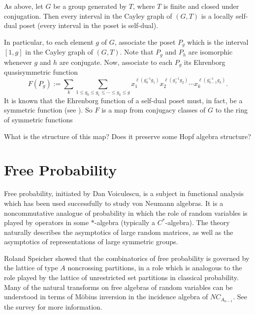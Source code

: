 \documentclass[12pt,letterpaper, reqno]{amsart}
\begin{document}
\begin{problemblock}As above, let $G$ be a group generated by $T$, where $T$ is finite and closed under conjugation. Then every interval in the Cayley graph of $(G,T)$ is a locally self-dual poset (every interval in the poset is self-dual).

In particular, to each element $g$ of $G$, associate the poset $P_g$ which is the interval $[1,g]$ in the Cayley graph of $(G,T)$. Note that $P_g$ and $P_h$ are isomorphic whenever $g$ and $h$ are conjugate. Now, associate to each $P_g$ its {\sf Ehrenborg quasisymmetric function}
\begin{equation*}
F(P_g):= \sum_k \sum_{1\leq g_0\leq g_1\leq\cdots\leq g_k\leq g} x_1^{\ell(g_0^{-1}g_1)}x_2^{\ell(g_1^{-1}g_2)}\cdots x_k^{\ell(g_{k-1}^{-1}g_k)}.
\end{equation*}
It is known that the Ehrenborg function of a self-dual poset must, in fact, be a symmetric function (see \cite{stanley}). So $F$ is a map from conjugacy classes of $G$ to the ring of symmetric functions

\begin{problem}What is the structure of this map? Does it preserve some Hopf algebra structure?\end{problem}

\end{problemblock}

\section{Free Probability}
Free probability, initiated by Dan Voiculescu, is a subject in functional analysis which has been used successfully to study von Neumann algebras. It is a noncommutative analogue of probability in which the role of random variables is played by operators in some $*$-algebra (typically a $C^*$-algebra). The theory naturally describes the asymptotics of large random matrices, as well as the asymptotics of representations of large symmetric groups.

Roland Speicher showed that the combinatorics of free probability is governed by the lattice of type $A$ noncrossing partitions, in a role which is analogous to the role played by the lattice of unrestricted set partitions in classical probability. Many of the natural transforms on free algebras of random variables can be understood in terms of M\"{o}bius inversion in the incidence algebra of $NC_{A_{n-1}}$. See the survey \cite{speicher:survey} for more information.
\end{document}
